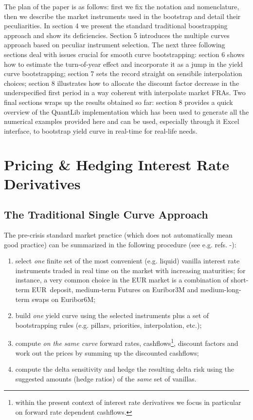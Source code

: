 \documentclass[11pt,reqno]{amsart}
\begin{document}
The plan of the paper is as follows: first we fix the notation and
nomenclature, then we describe the market instruments used in the bootstrap
and detail their peculiarities. In section 4 we present the standard
traditional boostrapping approach and show its deficiencies. Section 5
introduces the multiple curves approach based on peculiar instrument
selection. The next three following sections deal with issues crucial for
smooth curve bootstrapping:
section 6 shows how to estimate the turn-of-year
effect and incorporate it as a jump in the yield curve bootstrapping;
section 7 sets the record straight on sensibile
interpolation choices;
section 8 illustrates how to allocate the discount factor decrease in the
underspecified first period in a way coherent with interpolate market FRAs.
Two final sections wraps up the results obtained so far: section 8 provides
a quick overview of the QuantLib implementation which has been used to
generate all the numerical examples provided here and can be used,
especially through it Excel interface, to bootstrap yield curve in real-time
for real-life needs.

\section{Pricing \& Hedging Interest Rate Derivatives}

\subsection{\label{SecSingleCurve}The Traditional Single Curve Approach}
The pre-crisis standard market practice (which does not automatically mean good practice) can be summarized in the following procedure (see e.g. refs. \cite{HaganWest2008}-\cite{Ron2000}):

\begin{enumerate}
\item select \textit{one} finite set of the most convenient (e.g. liquid) vanilla interest rate instruments traded in real time on the market with increasing maturities; for instance, a very common choice in the EUR market is a combination of short-term EUR\ deposit, medium-term Futures on Euribor3M and medium-long-term swaps on Euribor6M;

\item build \textit{one} yield curve using the selected instruments plus a set of bootstrapping rules (e.g. pillars, priorities, interpolation, etc.);

\item compute \textit{on the same curve} forward rates, cashflows\footnote{within the present context of interest rate derivatives we focus in particular on forward rate dependent cashflows.}, discount factors and work out the prices by summing up the discounted cashflows;

\item compute the delta sensitivity and hedge the resulting delta risk using the suggested amounts (hedge ratios) of the \textit{same} set of vanillas.
\end{enumerate}
\end{document}
